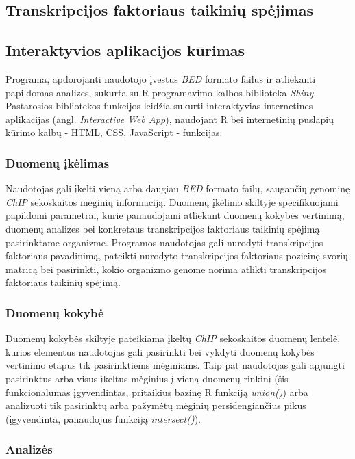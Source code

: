 \documentclass[12pt]{article}
\begin{document}
\subsection{Transkripcijos faktoriaus taikinių spėjimas}

\subsection{Interaktyvios aplikacijos kūrimas}

Programa, apdorojanti naudotojo įvestus \emph{BED} formato failus ir atliekanti
papildomas analizes, sukurta su R programavimo kalbos biblioteka
\emph{Shiny}\cite{SHINY}. Pastarosios bibliotekos funkcijos leidžia sukurti
interaktyvias internetines aplikacijas (angl. \emph{Interactive Web App}),
naudojant R bei internetinių puslapių kūrimo kalbų - HTML, CSS, JavaScript -
funkcijas.

\subsubsection*{Duomenų įkėlimas}
Naudotojas gali įkelti vieną arba daugiau \emph{BED} formato failų, saugančių
genominę \emph{ChIP} sekoskaitos mėginių informaciją. Duomenų įkėlimo skiltyje
specifikuojami papildomi parametrai, kurie panaudojami atliekant duomenų kokybės
vertinimą, duomenų analizes bei konkretaus transkripcijos faktoriaus taikinių
spėjimą pasirinktame organizme. Programos naudotojas gali nurodyti
transkripcijos faktoriaus pavadinimą, pateikti nurodyto transkripcijos
faktoriaus pozicinę svorių matricą bei pasirinkti, kokio organizmo genome
norima atlikti transkripcijos faktoriaus taikinių spėjimą.

\subsubsection*{Duomenų kokybė}
Duomenų kokybės skiltyje pateikiama įkeltų \emph{ChIP} sekoskaitos duomenų
lentelė, kurios elementus naudotojas gali pasirinkti bei vykdyti duomenų
kokybės vertinimo etapus tik pasirinktiems mėginiams. Taip pat naudotojas
gali apjungti pasirinktus arba visus įkeltus mėginius į vieną duomenų rinkinį
(šis funkcionalumas įgyvendintas, pritaikius bazinę R funkciją \emph{union()})
arba analizuoti tik pasirinktų arba pažymėtų mėginių persidengiančius pikus
(įgyvendinta, panaudojus funkciją \emph{intersect()}).

\subsubsection*{Analizės}
\end{document}
